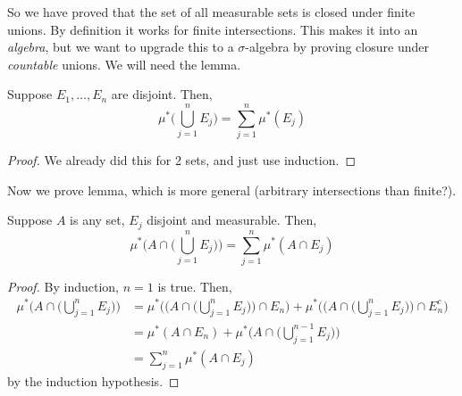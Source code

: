   So we have proved that the set of all measurable sets is closed under finite unions. By definition it works for finite intersections. This makes it into an \textit{algebra}, but we want to upgrade this to a $\sigma$-algebra by proving closure under \textit{countable} unions. We will need the lemma. 

  \begin{lemma} 
    Suppose $E_1, \ldots, E_n$ are disjoint. Then, 
    \begin{equation}
      \mu^\ast \bigg( \bigcup_{j=1}^n E_j \bigg) = \sum_{j=1}^n \mu^\ast (E_j)
    \end{equation}
  \end{lemma}
  \begin{proof}
    We already did this for 2 sets, and just use induction. 
  \end{proof} 

  Now we prove lemma, which is more general (arbitrary intersections than finite?). 

  \begin{lemma} 
    Suppose $A$ is any set, $E_j$ disjoint and measurable. Then, 
    \begin{equation}
      \mu^\ast \bigg( A \cap \Big( \bigcup_{j=1}^n E_j \Big) \bigg) = \sum_{j=1}^n \mu^\ast (A \cap E_j)
    \end{equation}
  \end{lemma}
  \begin{proof}
    By induction, $n = 1$ is true. Then, 
    \begin{align}
      \mu^\ast \bigg( A \cap \Big( \bigcup_{j=1}^n E_j \Big) \bigg) 
        & = \mu^\ast \Bigg( \bigg( A \cap \Big( \bigcup_{j=1}^n E_j \Big) \bigg) \cap E_n \Bigg) + \mu^\ast \Bigg( \bigg( A \cap \Big( \bigcup_{j=1}^n E_j \Big) \bigg) \cap E_n^c \Bigg) \\  
        & = \mu^\ast (A \cap E_n) + \mu^\ast \bigg( A \cap \Big( \bigcup_{j=1}^{n-1} E_j \Big) \bigg) \\ 
        & = \sum_{j=1}^n \mu^\ast (A \cap E_j)
    \end{align}
    by the induction hypothesis. 
  \end{proof}

